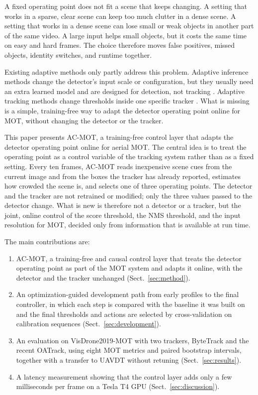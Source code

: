 \documentclass[pdflatex,sn-mathphys-num,iicol]{sn-jnl}
\begin{document}
A fixed operating point does not fit a scene that keeps changing. A setting
that works in a sparse, clear scene can keep too much clutter in a dense
scene. A setting that works in a dense scene can lose small or weak objects in
another part of the same video. A large input helps small objects, but it
costs the same time on easy and hard frames. The choice therefore moves false
positives, missed objects, identity switches, and runtime together.

Existing adaptive methods only partly address this problem. Adaptive inference
methods change the detector's input scale or configuration, but they usually
need an extra learned model and are designed for detection, not tracking
\cite{chin2019adascale,xu2020approxdet}. Adaptive tracking methods change
thresholds inside one specific tracker \cite{ma2023adaptivebytetrack,shim2024adaptrack}.
What is missing is a simple, training-free way to adapt the detector
operating point online for MOT, without changing the detector or the tracker.

This paper presents AC-MOT, a training-free control layer that adapts the
detector operating point online for aerial MOT. The central idea is to treat
the operating point as a control variable of the tracking system rather than
as a fixed setting. Every ten frames, AC-MOT reads inexpensive scene cues from
the current image and from the boxes the tracker has already reported,
estimates how crowded the scene is, and selects one of three operating
points. The detector and the tracker are not retrained or modified; only the
three values passed to the detector change. What is new is therefore not a
detector or a tracker, but the joint, online control of the score threshold,
the NMS threshold, and the input resolution for MOT, decided only from
information that is available at run time.

The main contributions are:
\begin{enumerate}
\item AC-MOT, a training-free and causal control layer that treats the
      detector operating point as part of the MOT system and adapts it online,
      with the detector and the tracker unchanged (Sect.~\ref{sec:method}).
\item An optimization-guided development path from early profiles to the
      final controller, in which each step is compared with the baseline it
      was built on and the final thresholds and actions are selected by
      cross-validation on calibration sequences (Sect.~\ref{sec:development}).
\item An evaluation on VisDrone2019-MOT with two trackers, ByteTrack and the
      recent OATrack, using eight MOT metrics and paired bootstrap intervals,
      together with a transfer to UAVDT without retuning
      (Sect.~\ref{sec:results}).
\item A latency measurement showing that the control layer adds only a few
      milliseconds per frame on a Tesla T4 GPU (Sect.~\ref{sec:discussion}).
\end{enumerate}
\end{document}
